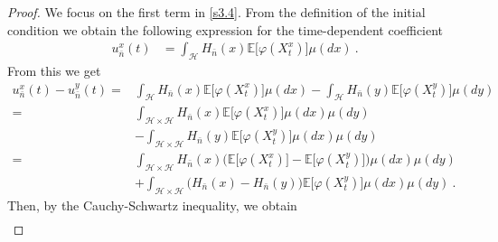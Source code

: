 \documentclass[]{interact}
\newcommand{\E}{\mathbb{E}}
\theoremstyle{plain}%
\theoremstyle{definition}
\theoremstyle{remark}
\begin{document}
\begin{proof}
            We focus on the first term in \eqref{s3.4}. From the definition of 
            the
        initial condition we obtain the following expression for
        the time-dependent coefficient
        \begin{align*}
          u_{\bar n}^x(t) &=
            \int_{\mathcal{H}} H_{\bar n}(x) \E\big[\varphi(X_t^x)\big] \mu(dx) 
            \ .
        \end{align*}
        From this we get
        \begin{align*}
            u_{\bar n}^x(t)-u_{\bar n}^y(t)
                =&
                \int_{\mathcal{H}} H_{\bar n}(x)
                    \E\big[
                        \varphi(X_t^x)
                    \big]
                    \mu(dx) -
                    \int_{\mathcal{H}} H_{\bar n}(y)
                    \E\big[
                        \varphi(X_t^y)
                    \big] \mu(dy)
                \\
                =&
                \int_{\mathcal{H} \times \mathcal{H}} H_{\bar n}(x)
                    \E\big[
                        \varphi(X_t^x)
                    \big] \mu(dx)\mu(dy)
                \\
                &-
                     \int_{\mathcal{H}\times \mathcal{H}} H_{\bar n}(y)
                        \E\big[
                            \varphi(X_t^y)
                        \big]
                    \mu(dx)\mu(dy)
                \\
                =&
                \int_{\mathcal{H}\times \mathcal{H}} H_{\bar n}(x)
                    \Big(
                        \E\big[
                            \varphi(X_t^x)
                        \big]
                        -
                        \E\big[
                            \varphi(X_t^y)
                        \big]
                    \Big)
                    \mu(dx)\mu(dy)
                \\
                &+
                \int_{\mathcal{H}\times \mathcal{H}}
                    \Big(
                        H_{\bar n}(x) - H_{\bar n}(y)
                    \Big)
                    \E\big[
                        \varphi(X_t^y)
                    \big] \mu(dx) \mu(dy) \ .
        \end{align*}
        Then, by the Cauchy-Schwartz inequality, we obtain
        \begin{equation}
            \begin{aligned}

\end{aligned}
\end{equation}
\end{proof}
\end{document}
